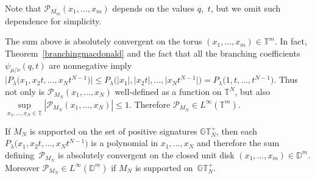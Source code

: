 \documentclass[pdftex]{sigma}
\numberwithin{equation}{section}
\newcommand{\GTp}{\mathbb{GT}^+}
\newcommand{\PPP}{\mathcal{P}}
\newcommand{\TT}{\mathbb{T}}
\newcommand{\DDD}{\mathbb{D}}
\begin{document}
Note that $\mathcal{P}_{M_m}(x_1, \dots, x_m)$ depends on the values $q$,~$t$, but we omit such dependence for simplicity.

The sum above is absolutely convergent on the torus $(x_1, \dots, x_m)\in\TT^m$. In fact, Theo\-rem~\ref{branchingmacdonald} and the fact that all the branching coef\/f\/icients $\psi_{\mu/\nu}(q, t)$ are nonnegative imply $\big| P_{\lambda}\big(x_1, x_2t, \dots, x_Nt^{N-1}\big) \big| \leq P_{\lambda}\big(|x_1|, |x_2t|, \dots, \big|x_N t^{N-1}\big|\big) = P_{\lambda}\big(1, t, \dots, t^{N-1}\big)$. Thus not only is $\PPP_{M_N}(x_1, \dots, x_N)$ well-def\/ined as a function on $\TT^N$, but also $\sup\limits_{x_1, \dots, x_N\in\TT}{|\PPP_{M_N}(x_1, \dots, x_N)|} \leq 1$. Therefore $\PPP_{M_N}\in L^{\infty}(\TT^m)$.

If $M_N$ is supported on the set of positive signatures $\GTp_N$, then each $P_{\lambda}\big(x_1, x_2t, \dots, x_Nt^{N-1}\big)$ is a polynomial in $x_1, \dots, x_N$ and therefore the sum def\/ining~$\PPP_{M_N}$ is absolutely convergent on the closed unit disk $(x_1, \dots, x_m)\in\DDD^m$. Moreover $\PPP_{M_N}\in L^{\infty}(\DDD^m)$ if $M_N$ is supported on~$\GTp_N$.
\end{document}
